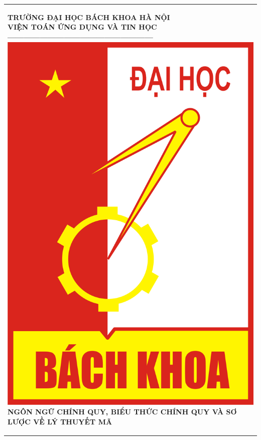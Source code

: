 \documentclass[14pt]{extreport}
\begin{document}
\newcommand{\Khung}[2]{
\begin{tabular}{|l|}
\hline\rule[-2ex]{0pt}{5.5ex}
\parbox{#1}{#2}\\
\hline
\end{tabular}
}

\Khung{.92\textwidth}{

\begin{center}
\normalsize
\textbf{TRƯỜNG ĐẠI HỌC BÁCH KHOA HÀ NỘI}\\
\normalsize
\textbf{VIỆN TOÁN ỨNG DỤNG VÀ TIN HỌC}\\
\textbf{------------------------------------------------------}\\[0.4cm]
\includegraphics[scale=.2]{logobkdentrang}\\[1.2cm]
\textbf{{\large NGÔN NGỮ CHÍNH QUY, BIỂU THỨC CHÍNH QUY VÀ SƠ LƯỢC VỀ LÝ THUYẾT MÃ}}\\

\end{center}}
\end{document}
